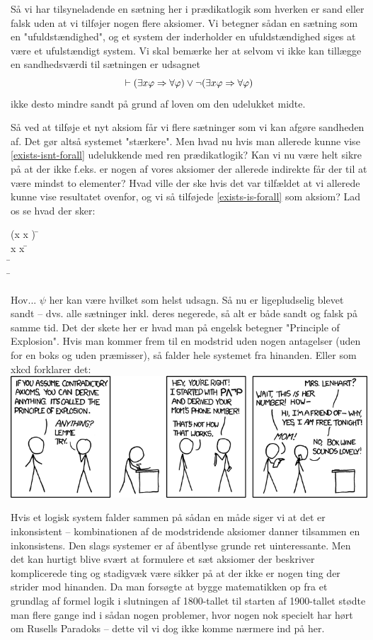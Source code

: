 Så vi har tilsyneladende en sætning her i prædikatlogik som hverken er sand eller falsk uden at vi tilføjer nogen flere aksiomer.
Vi betegner sådan en sætning som en "ufuldstændighed"{},
og et system der inderholder en ufuldstændighed siges at være et ufulstændigt system.
Vi skal bemærke her at selvom vi ikke kan tillægge en sandhedsværdi til sætningen er udsagnet
\[
	\vdash (\exists x \varphi \Rightarrow \forall \varphi) \lor \neg(\exists x \varphi \Rightarrow \forall \varphi)
\]
ikke desto mindre sandt på grund af loven om den udelukket midte.

Så ved at tilføje et nyt aksiom får vi flere sætninger som vi kan afgøre sandheden af. Det gør altså systemet "stærkere".
Men hvad nu hvis man allerede kunne vise \eqref{exists-isnt-forall} udelukkende med ren prædikatlogik?
Kan vi nu være helt sikre på at der ikke f.eks. er nogen af vores aksiomer der allerede indirekte får der til at være mindst
to elementer? Hvad ville der ske hvis det var tilfældet at vi allerede kunne vise resultatet ovenfor, og vi så tilføjede
\eqref{exists-is-forall} som aksiom? Lad os se hvad der sker:
\begin{proofbox}
	\: \neg(\exists x \phi \imp \forall x \phi) \=  \\
	\: \exists x \phi \imp \forall x \phi \=  \\
	\: \bot \=  \\
	\: \psi \= 
\end{proofbox}
Hov... $\psi$ her kan være hvilket som helst udsagn. Så nu er  ligepludselig blevet sandt -- dvs. alle sætninger inkl. deres negerede,
så alt er både sandt og falsk på samme tid. Det der skete her er hvad man på engelsk betegner "Principle of Explosion"{}. Hvis man kommer frem til en
modstrid uden nogen antagelser (uden for en boks og uden præmisser), så falder hele systemet fra hinanden. Eller som xkcd forklarer det:
\includegraphics[width=\textwidth]{principle_of_explosion.png}

Hvis et logisk system falder sammen på sådan en måde siger vi at det er inkonsistent --
kombinationen af de modstridende aksiomer danner tilsammen en inkonsistens.
Den slags systemer er af åbentlyse grunde ret uinteressante.
Men det kan hurtigt blive svært at formulere et sæt aksiomer der beskriver komplicerede ting
og stadigvæk være sikker på at der ikke er nogen ting der strider mod hinanden.
Da man forsøgte at bygge matematikken op fra et grundlag af formel logik i slutningen
af 1800-tallet til starten af 1900-tallet stødte man flere gange ind i sådan nogen problemer,
hvor nogen nok specielt har hørt om Rusells Paradoks -- dette vil vi dog ikke komme nærmere
ind på her.

